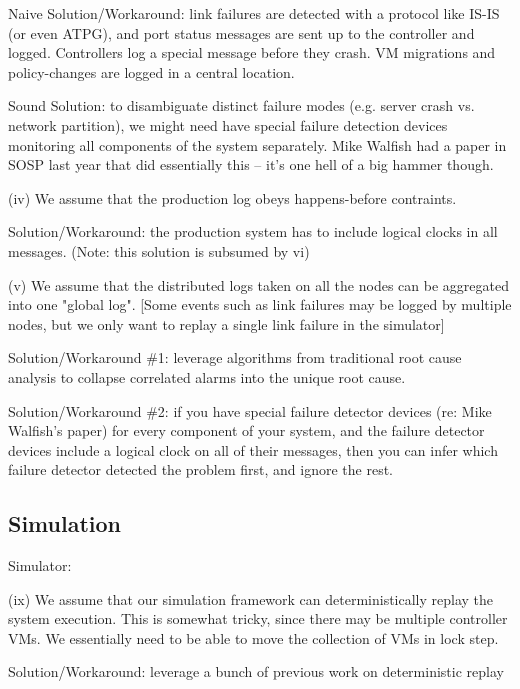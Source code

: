 Naive Solution/Workaround: link failures are detected with a protocol like IS-IS (or even ATPG), and port status messages are sent up to the controller and logged. Controllers log a special message before they crash. VM migrations and policy-changes are logged in a central location.

Sound Solution: to disambiguate distinct failure modes (e.g. server crash vs. network partition), we might need have special failure detection devices monitoring all components of the system separately. Mike Walfish had a paper in SOSP last year that did essentially this -- it's one hell of a big hammer though.
                           
(iv) We assume that the production log obeys happens-before contraints.
 
Solution/Workaround: the production system has to include logical clocks in all messages. (Note: this solution is subsumed by vi)                                                                                      
                 
(v) We assume that the distributed logs taken on all the nodes can be aggregated into one "global log". [Some events such as link failures may be logged by multiple nodes, but we only want to replay a single link failure in the simulator]

Solution/Workaround \#1: leverage algorithms from traditional root cause analysis to collapse correlated alarms into the unique root cause.

Solution/Workaround \#2: if you have special failure detector devices (re: Mike Walfish's paper) for every component of your system, and the failure detector devices include a logical clock on all of their messages, then you can infer which failure detector detected the problem first, and ignore the rest.                                                            

\subsection{Simulation}

Simulator:

(ix) We assume that our simulation framework can deterministically replay the system execution. This is somewhat tricky, since there may be multiple controller VMs. We essentially need to be able to move the collection of VMs in lock step.

Solution/Workaround: leverage a bunch of previous work on deterministic replay

